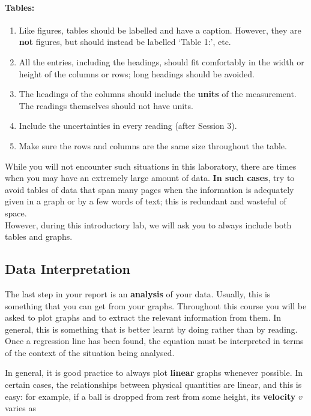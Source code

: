 \paragraph{Tables:}

\begin{enumerate}
    \item Like figures, tables should be labelled and have a caption. However, they are \textbf{not} figures, but should instead be labelled `Table 1:', etc.
    \item All the entries, including the headings, should fit comfortably in the width or height of the columns or rows; long headings should be avoided. 
    \item The headings of the columns should include the \textbf{units} of the measurement. The readings themselves should not have units.
    \item Include the uncertainties in every reading (after Session 3).
    \item Make sure the rows and columns are the same size throughout the table.
\end{enumerate}

\begin{imp}
While you will not encounter such situations in this laboratory, there are times when you may have an extremely large amount of data. \textbf{In such cases}, try to avoid tables of data that span many pages when the information is adequately given in a graph or by a few words of text; this is redundant and wasteful of space. ~\\

However, during this introductory lab, we will ask you to always include both tables and graphs.
\end{imp}

\subsection{Data Interpretation}

The last step in your report is an \textbf{analysis} of your data. Usually, this is something that you can get from your graphs. Throughout this course you will be asked to plot graphs and to extract the relevant information from them. In general, this is something that is better learnt by doing rather than by reading.  Once a regression line has been found, the equation must be interpreted in terms of the context of the situation being analysed.

In general, it is good practice to always plot \textbf{linear} graphs whenever possible. In certain cases, the relationships between physical quantities are linear, and this is easy: for example, if a ball is dropped from rest from some height, its \textbf{velocity} $v$ varies as


